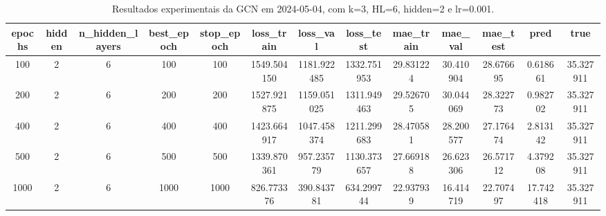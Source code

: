 \begin{table}[h]
\centering
\caption{Resultados experimentais da GCN em 2024-05-04, com k=3, HL=6, hidden=2 e lr=0.001.}
\label{tab:gcn_results_k3_hl6_h2_d20240504}
\begin{tabular}{ccccccccccccc}
\toprule
epochs & hidden & n\_hidden\_layers & best\_epoch & stop\_epoch & loss\_train & loss\_val & loss\_test & mae\_train & mae\_val & mae\_test & pred & true \\
\midrule
100 & 2 & 6 & 100 & 100 & 1549.504150 & 1181.922485 & 1332.751953 & 29.831224 & 30.410904 & 28.676695 & 0.618661 & 35.327911 \\
200 & 2 & 6 & 200 & 200 & 1527.921875 & 1159.051025 & 1311.949463 & 29.526705 & 30.044069 & 28.322773 & 0.982702 & 35.327911 \\
400 & 2 & 6 & 400 & 400 & 1423.664917 & 1047.458374 & 1211.299683 & 28.470581 & 28.200577 & 27.176474 & 2.813142 & 35.327911 \\
500 & 2 & 6 & 500 & 500 & 1339.870361 & 957.235779 & 1130.373657 & 27.669188 & 26.623306 & 26.571712 & 4.379208 & 35.327911 \\
1000 & 2 & 6 & 1000 & 1000 & 826.773376 & 390.843781 & 634.299744 & 22.937939 & 16.414719 & 22.707497 & 17.742418 & 35.327911 \\
\bottomrule
\end{tabular}
\end{table}
